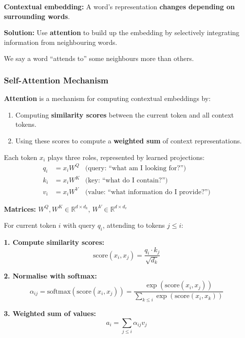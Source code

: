 \begin{defbox}
\textbf{Contextual embedding:} A word's representation \textbf{changes depending on surrounding words}.

\textbf{Solution:} Use \textbf{attention} to build up the embedding by selectively integrating information from neighbouring words.

We say a word ``attends to'' some neighbours more than others.
\end{defbox}

\bigseparator

\subsubsection{Self-Attention Mechanism}

\begin{defbox}
\textbf{Attention} is a mechanism for computing contextual embeddings by:
\begin{enumerate}
  \item Computing \textbf{similarity scores} between the current token and all context tokens.
  \item Using these scores to compute a \textbf{weighted sum} of context representations.
\end{enumerate}
\end{defbox}

\begin{defbox}
Each token $x_i$ plays three roles, represented by learned projections:
\begin{align*}
q_i &= x_i W^Q & \text{(query: ``what am I looking for?'')} \\
k_i &= x_i W^K & \text{(key: ``what do I contain?'')} \\
v_i &= x_i W^V & \text{(value: ``what information do I provide?'')}
\end{align*}

\textbf{Matrices:} $W^Q, W^K \in \mathbb{R}^{d \times d_k}$, $W^V \in \mathbb{R}^{d \times d_v}$
\end{defbox}

\begin{thmbox}
For current token $i$ with query $q_i$, attending to tokens $j \leq i$:

\textbf{1. Compute similarity scores:}
\[
\text{score}(x_i, x_j) = \frac{q_i \cdot k_j}{\sqrt{d_k}}
\]

\textbf{2. Normalise with softmax:}
\[
\alpha_{ij} = \text{softmax}(\text{score}(x_i, x_j)) = \frac{\exp(\text{score}(x_i, x_j))}{\sum_{k \leq i} \exp(\text{score}(x_i, x_k))}
\]

\textbf{3. Weighted sum of values:}
\[
a_i = \sum_{j \leq i} \alpha_{ij} v_j
\]
\end{thmbox}

